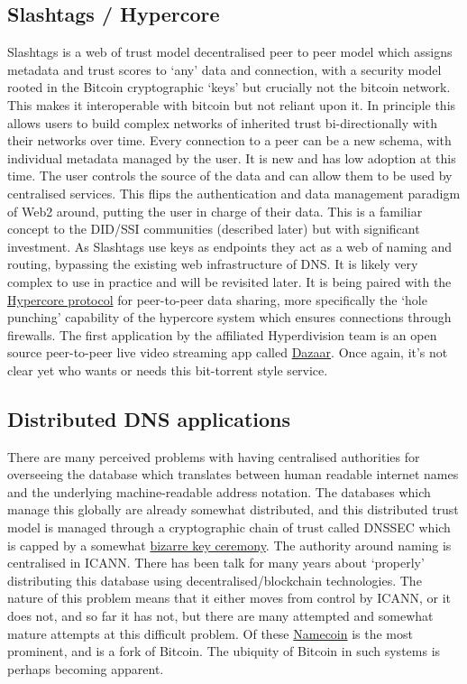 \subsection{Slashtags / Hypercore}
Slashtags is a web of trust model decentralised peer to peer model which assigns metadata and trust scores to `any' data and connection, with a security model rooted in the Bitcoin cryptographic `keys' but crucially not the bitcoin network. This makes it interoperable with bitcoin but not reliant upon it. In principle this allows users to build complex networks of inherited trust bi-directionally with their networks over time. Every connection to a peer can be a new schema, with individual metadata managed by the user. It is new and has low adoption at this time. The user controls the source of the data and can allow them to be used by centralised services. This flips the authentication and data management paradigm of Web2 around, putting the user in charge of their data. This is a familiar concept to the DID/SSI communities (described later) but with significant investment. As Slashtags use keys as endpoints they act as a web of naming and routing, bypassing the existing web infrastructure of DNS. It is likely very complex to use in practice and will be revisited later. It is being paired with the \href{https://hypercore-protocol.org/}{Hypercore protocol} for peer-to-peer data sharing, more specifically the `hole punching' capability of the hypercore system which ensures connections through firewalls\cite{ford2005peer}. The first application by the affiliated Hyperdivision team is an open source peer-to-peer live video streaming app called \href{https://dazaar.com/}{Dazaar}. Once again, it's not clear yet who wants or needs this bit-torrent style service. 
\subsection{Distributed DNS applications} 
There are many perceived problems with having centralised authorities for overseeing the database which translates between human readable internet names and the underlying machine-readable address notation. The databases which manage this globally are already somewhat distributed, and this distributed trust model is managed through a cryptographic chain of trust called DNSSEC which is capped by a somewhat \href{https://www.iana.org/dnssec/ceremonies}{bizarre key ceremony}. The authority around naming is centralised in ICANN. There has been talk for many years about `properly' distributing this database using decentralised/blockchain technologies\cite{karaarslan2018blockchain}. The nature of this problem means that it either moves from control by ICANN, or it does not, and so far it has not, but there are many attempted and somewhat mature attempts at this difficult problem. Of these \href{https://www.namecoin.org/}{Namecoin} is the most prominent, and is a fork of Bitcoin. The ubiquity of Bitcoin in such systems is perhaps becoming apparent.
